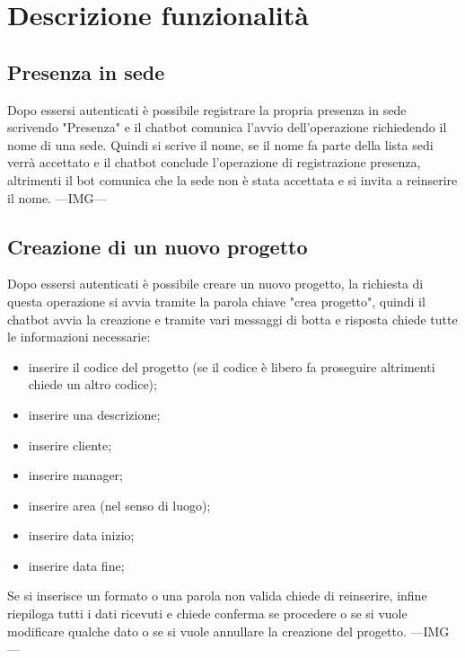 \section{Descrizione funzionalità}
\subsection{Presenza in sede}
Dopo essersi autenticati è possibile registrare la propria presenza in sede scrivendo "Presenza" e il chatbot comunica l'avvio dell'operazione richiedendo il nome di una sede. 
Quindi si scrive il nome, se il nome fa parte della lista sedi verrà accettato e il chatbot conclude l'operazione di registrazione presenza, altrimenti il bot comunica che la sede non è stata accettata e si invita a reinserire il nome. ---IMG--- \newline
\subsection{Creazione di un nuovo progetto}
Dopo essersi autenticati è possibile creare un nuovo progetto, la richiesta di questa operazione si avvia tramite la parola chiave "crea progetto", quindi il chatbot avvia la creazione e tramite vari messaggi di botta e risposta chiede tutte le informazioni necessarie:
\begin{itemize}
    \item inserire il codice del progetto (se il codice è libero fa proseguire altrimenti chiede un altro codice);
    \item inserire una descrizione;
    \item inserire cliente;
    \item inserire manager;
    \item inserire area (nel senso di luogo);
    \item inserire data inizio;
    \item inserire data fine;
\end{itemize}
Se si inserisce un formato o una parola non valida chiede di reinserire, infine riepiloga tutti i dati ricevuti e chiede conferma se procedere o se si vuole modificare qualche dato o se si vuole annullare la creazione del progetto. ---IMG---
